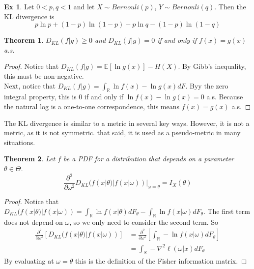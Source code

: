 \documentclass{article}
\newtheorem{theorem}{Theorem}
\theoremstyle{definition}\newtheorem{definition}{DEF}
\theoremstyle{definition}\newtheorem{example}{Ex}
\theoremstyle{lemma}\newtheorem{lemma}{Lemma}
\theoremstyle{corrolary}\newtheorem{corrolary}{Cor}
\begin{document}
\begin{example}
Let $0<p, q< 1$ and let $X\sim Bernouli(p)$, $Y\sim Bernouli(q)$.
Then the KL divergence is
\begin{equation*}
p\ln p + (1-p) \ln (1-p) - p \ln q -(1-p) \ln (1-q)
\end{equation*}
\end{example}

\begin{theorem}
$D_{KL}(f|g)\geq 0$ and $D_{KL}(f|g)=0$ if and only if $f(x)=g(x)$ a.s.
\end{theorem}
\begin{proof}
Notice that $D_{KL}(f|g)=\mathbb{E}\left[ \ln g(x)\right] - H(X)$.
By Gibb's inequality, this must be non-negative. \\
Next, notice that $D_{KL}(f|g) = \int_\mathbb{R} \ln f(x) - \ln g(x) dF$.
Byy the zero integral property, this is 0 if and only if $\ln f(x) - \ln g(x)=0$ a.s.
Because the natural log is a one-to-one correspondence, this means $f(x)=g(x)$ a.s.
\end{proof}

The KL divergence is similar to a metric in several key ways.
However, it is not a metric, as it is not symmetric.
that said, it is used as a pseudo-metric in many situations.

\begin{theorem}
Let $f$ be a PDF for a distribution that depends on a parameter $\theta \in \Theta$.
\begin{equation}
\frac{\partial^2}{\partial \omega^2} D_{KL}(f(x|\theta)|f(x|\omega))\Big|_{\omega=\theta} = I_X(\theta)
\end{equation}
\end{theorem}
\begin{proof}
Notice that $D_{KL}(f(x|\theta)|f(x|\omega))=\int_\mathbb{R} \ln f(x|\theta)dF_\theta - \int_\mathbb{R} \ln f(x|\omega)dF_\theta$.
The first term does not depend on $\omega$, so we only need to consider the second term.
So
\begin{align*}
\frac{\partial^2}{\partial \omega^2} \left[ D_{KL} (f(x|\theta)|f(x|\omega))\right]
&= \frac{\partial^2}{\partial \omega^2} \left[ \int_\mathbb{R} -\ln f(x|\omega)dF_\theta \right] \\
&= \int_\mathbb{R} -\nabla^2 \ell (\omega | x) dF_\theta
\end{align*}
By evaluating at $\omega = \theta$ this is the definition of the Fisher information matrix.
\end{proof}
\end{document}
